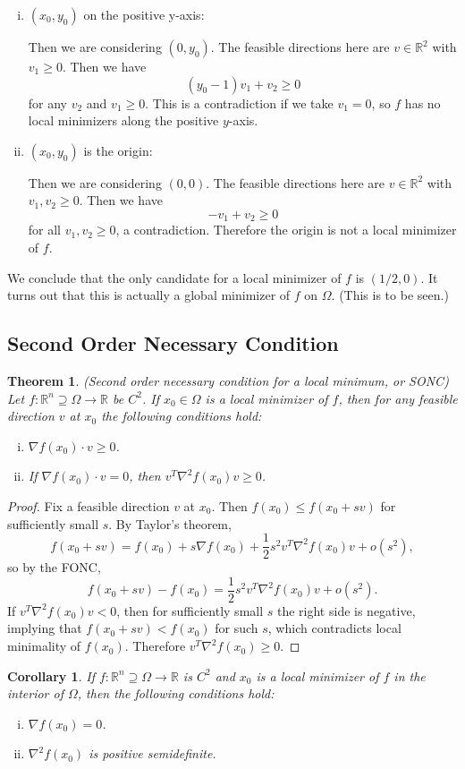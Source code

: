 \documentclass[11pt]{book}
\newcommand{\R}{\mathbb{R}}
\newtheorem{theorem}{Theorem}[subsection]
\newtheorem{corollary}{Corollary}[subsection]
\begin{document}
\begin{enumerate}
\begin{enumerate}[(i)]
\item $(x_0, y_0)$ on the positive y-axis:

Then we are considering $(0, y_0)$. The feasible directions here are $v \in \R^2$ with $v_1 \geq 0$. Then we have
\[
(y_0 - 1)v_1 + v_2 \geq 0
\]
for any $v_2$ and $v_1 \geq 0$. This is a contradiction if we take $v_1 = 0$, so $f$ has no local minimizers along the positive $y$-axis.

\item $(x_0, y_0)$ is the origin:

Then we are considering $(0,0)$. The feasible directions here are $v \in \R^2$ with $v_1, v_2 \geq 0$. Then we have
\[
-v_1 + v_2 \geq 0
\]
for all $v_1, v_2 \geq 0$, a contradiction. Therefore the origin is not a local minimizer of $f$.
\end{enumerate}
We conclude that the only candidate for a local minimizer of $f$ is $(1/2, 0)$. It turns out that this is actually a global minimizer of $f$ on $\Omega$. (This is to be seen.)
\end{enumerate}

\subsection{Second Order Necessary Condition}

\begin{theorem}
(Second order necessary condition for a local minimum, or SONC) Let $f : \R^n \supseteq \Omega \to \R$ be $C^2$. If $x_0 \in \Omega$ is a local minimizer of $f$, then for any feasible direction $v$ at $x_0$ the following conditions hold:
\begin{enumerate}[(i)]
\item $\nabla f(x_0) \cdot v \geq 0$.
\item If $\nabla f(x_0) \cdot v = 0$, then $v^T \nabla^2 f(x_0) v \geq 0$.
\end{enumerate}
\end{theorem}
\begin{proof}
Fix a feasible direction $v$ at $x_0$. Then $f(x_0) \leq f(x_0 + sv)$ for sufficiently small $s$. By Taylor's theorem,
\[
f(x_0 + sv) = f(x_0) + s \nabla f(x_0) + \frac{1}{2} s^2 v^T \nabla^2 f(x_0) v + o(s^2),
\]
so by the FONC,
\[
f(x_0 + sv) - f(x_0) = \frac{1}{2} s^2 v^T \nabla^2 f(x_0) v + o(s^2).
\]
If $v^T \nabla^2 f(x_0) v < 0$, then for sufficiently small $s$ the right side is negative, implying that $f(x_0 + sv) < f(x_0)$ for such $s$, which contradicts local minimality of $f(x_0)$. Therefore $v^T \nabla^2 f(x_0) \geq 0$.
\end{proof}
\begin{corollary}
If $f : \R^n \supseteq \Omega \to \R$ is $C^2$ and $x_0$ is a local minimizer of $f$ in the interior of $\Omega$, then the following conditions hold:
\begin{enumerate}[(i)]
\item $\nabla f(x_0) = 0$.
\item $\nabla^2 f(x_0)$ is positive semidefinite.
\end{enumerate}
\end{corollary}
\end{document}
